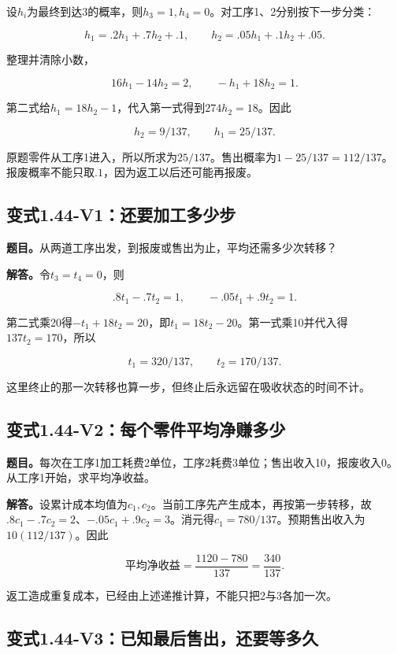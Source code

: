 \documentclass[
  11pt,
  a4paper,
  UTF8,
  fontset=fandol]{ctexart}
\begin{document}
设\(h_i\)为最终到达3的概率，则\(h_3=1,h_4=0\)。对工序1、2分别按下一步分类：

\[
h_1=.2h_1+.7h_2+.1,\qquad
h_2=.05h_1+.1h_2+.05.
\]

整理并清除小数，

\[
16h_1-14h_2=2,\qquad -h_1+18h_2=1.
\]

第二式给\(h_1=18h_2-1\)，代入第一式得到\(274h_2=18\)。因此

\[
\boxed{h_2=9/137,\qquad h_1=25/137.}
\]

原题零件从工序1进入，所以所求为\(\boxed{25/137}\)。售出概率为\(1-25/137=112/137\)。报废概率不能只取\(.1\)，因为返工以后还可能再报废。

\subsection{变式1.44-V1：还要加工多少步}\label{ux53d8ux5f0f1.44-v1ux8fd8ux8981ux52a0ux5de5ux591aux5c11ux6b65}

\textbf{题目。}从两道工序出发，到报废或售出为止，平均还需多少次转移？

\textbf{解答。}令\(t_3=t_4=0\)，则

\[
.8t_1-.7t_2=1,\qquad -.05t_1+.9t_2=1.
\]

第二式乘20得\(-t_1+18t_2=20\)，即\(t_1=18t_2-20\)。第一式乘10并代入得\(137t_2=170\)，所以

\[
\boxed{t_1=320/137,\qquad t_2=170/137.}
\]

这里终止的那一次转移也算一步，但终止后永远留在吸收状态的时间不计。

\subsection{变式1.44-V2：每个零件平均净赚多少}\label{ux53d8ux5f0f1.44-v2ux6bcfux4e2aux96f6ux4ef6ux5e73ux5747ux51c0ux8d5aux591aux5c11}

\textbf{题目。}每次在工序1加工耗费2单位，工序2耗费3单位；售出收入10，报废收入0。从工序1开始，求平均净收益。

\textbf{解答。}设累计成本均值为\(c_1,c_2\)。当前工序先产生成本，再按第一步转移，故\(.8c_1-.7c_2=2\)、\(-.05c_1+.9c_2=3\)。消元得\(c_1=780/137\)。预期售出收入为\(10(112/137)\)。因此

\[
\boxed{\text{平均净收益}=\frac{1120-780}{137}=\frac{340}{137}.}
\]

返工造成重复成本，已经由上述递推计算，不能只把2与3各加一次。

\subsection{变式1.44-V3：已知最后售出，还要等多久}\label{ux53d8ux5f0f1.44-v3ux5df2ux77e5ux6700ux540eux552eux51faux8fd8ux8981ux7b49ux591aux4e45}
\end{document}
